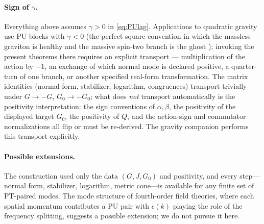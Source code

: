 \documentclass[11pt]{article}
\theoremstyle{definition}
\theoremstyle{remark}
\begin{document}
\paragraph{Sign of $\gamma$.}
Everything above assumes $\gamma>0$ in \eqref{eq:PUlag}.  Applications to
quadratic gravity use PU blocks with $\gamma<0$ (the perfect-square
convention in which the massless graviton is healthy and the massive
spin-two branch is the ghost \cite{companionGrav}); invoking the present
theorems there requires an explicit transport --- multiplication of the
action by $-1$, an exchange of which normal mode is declared positive, a
quarter-turn of one branch, or another specified real-form
transformation.  The matrix identities (normal form, stabilizer,
logarithm, congruences) transport trivially under $G\to-G$, $G_0\to-G_0$;
what does \emph{not} transport automatically is the positivity
interpretation: the sign conventions of $\alpha,\beta$, the positivity of
the displayed target $G_0$, the positivity of $Q$, and the action-sign
and commutator normalizations all flip or must be re-derived.  The
gravity companion \cite{companionGrav} performs this transport
explicitly.

\paragraph{Possible extensions.}
The construction used only the data $(G,J,G_0)$ and positivity, and every
step---normal form, stabilizer, logarithm, metric cone---is available for any
finite set of PT-paired modes.  The mode structure of fourth-order field
theories, where each spatial momentum contributes a PU pair with
$\epsilon(k)$ playing the role of the frequency splitting, suggests a
possible extension; we do not pursue it here.
\end{document}
